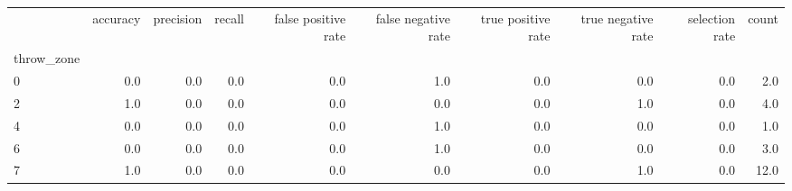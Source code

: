 \begin{tabular}{lrrrrrrrrr}
\toprule
{} &  accuracy &  precision &  recall &  false positive rate &  false negative rate &  true positive rate &  true negative rate &  selection rate &  count \\
throw\_zone &           &            &         &                      &                      &                     &                     &                 &        \\
\midrule
0          &       0.0 &        0.0 &     0.0 &                  0.0 &                  1.0 &                 0.0 &                 0.0 &             0.0 &    2.0 \\
2          &       1.0 &        0.0 &     0.0 &                  0.0 &                  0.0 &                 0.0 &                 1.0 &             0.0 &    4.0 \\
4          &       0.0 &        0.0 &     0.0 &                  0.0 &                  1.0 &                 0.0 &                 0.0 &             0.0 &    1.0 \\
6          &       0.0 &        0.0 &     0.0 &                  0.0 &                  1.0 &                 0.0 &                 0.0 &             0.0 &    3.0 \\
7          &       1.0 &        0.0 &     0.0 &                  0.0 &                  0.0 &                 0.0 &                 1.0 &             0.0 &   12.0 \\
\bottomrule
\end{tabular}

